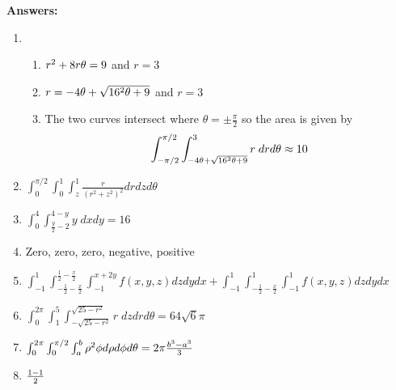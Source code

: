 \documentclass[12pt]{article}
\let\sin\relax\DeclareMathOperator{\sin}{\mathsf{sin}}
\let\cos\relax\DeclareMathOperator{\cos}{\mathsf{cos}}
\begin{document}
{\bf Answers:}
\begin{enumerate}
\item\begin{enumerate}
\item $r^2+8r\cos{\theta}=9$ and $r=3$
\item $r=-4\cos{\theta}+\sqrt{16\cos^2{\theta}+9}$ and $r=3$
\item The two curves intersect where $\theta=\pm\frac{\pi}{2}$ so the
area is given by \[\int_{-\pi/2}^{\pi/2}\int
_{-4\cos{\theta}+\sqrt{16\cos^2{\theta}+9}}^3r\;drd\theta\approx 10\]
\end{enumerate}
\item $\int_0^{\pi/2}\int_0^1\int_z^1
\frac{r}{\left(r^2+z^2\right)^2}drdzd\theta$
\item $\int_0^4\int_{\frac{y}{2}-2}^{4-y}y\;dxdy=16$
\item Zero, zero, zero, negative, positive
\item $\int_{-1}^1\int_{-\frac{1}{2}-\frac{x}{2}}
^{\frac{1}{2}-\frac{x}{2}}\int_{-1}^{x+2y}
f\left(x,y,z\right)dzdydx
+\int_{-1}^1\int_{-\frac{1}{2}-\frac{x}{2}}
^1\int_{-1}^1
f\left(x,y,z\right)dzdydx$
\item $\int_0^{2\pi}\int_1^5\int_{-\sqrt{25-r^2}}
^{\sqrt{25-r^2}}r\;dzdrd\theta=64\sqrt{6}\pi$
\item $\int_0^{2\pi}\int_0^{\pi/2}\int_a^b\rho^2\sin{\phi}
d\rho d\phi d\theta=2\pi\frac{b^3-a^3}{3}$
\item $\frac{1-\cos{1}}{2}$
\end{enumerate}
\end{document}
